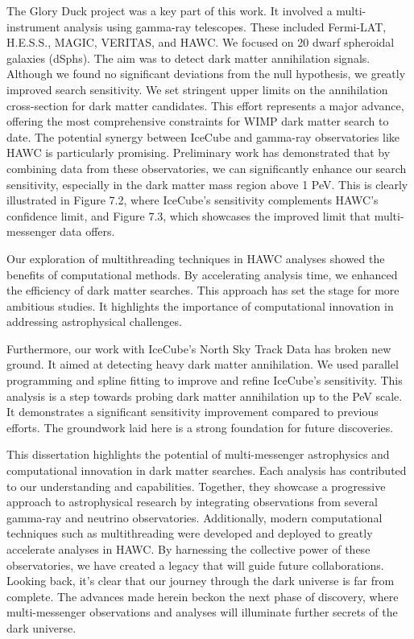 The Glory Duck project was a key part of this work.
It involved a multi-instrument analysis using gamma-ray telescopes. These included Fermi-LAT, H.E.S.S., MAGIC, VERITAS, and HAWC.
We focused on 20 dwarf spheroidal galaxies (dSphs).
The aim was to detect dark matter annihilation signals.
Although we found no significant deviations from the null hypothesis, we greatly improved search sensitivity.
We set stringent upper limits on the annihilation cross-section for dark matter candidates.
This effort represents a major advance, offering the most comprehensive constraints for WIMP dark matter search to date.
The potential synergy between IceCube and gamma-ray observatories like HAWC is particularly promising.
Preliminary work has demonstrated that by combining data from these observatories, we can significantly enhance our search sensitivity, especially in the dark matter mass region above 1 PeV.
This is clearly illustrated in Figure 7.2, where IceCube's sensitivity complements HAWC's confidence limit, and Figure 7.3, which showcases the improved limit that multi-messenger data offers.

Our exploration of multithreading techniques in HAWC analyses showed the benefits of computational methods.
By accelerating analysis time, we enhanced the efficiency of dark matter searches. This approach has set the stage for more ambitious studies.
It highlights the importance of computational innovation in addressing astrophysical challenges.

Furthermore, our work with IceCube's North Sky Track Data has broken new ground.
It aimed at detecting heavy dark matter annihilation.
We used parallel programming and spline fitting to improve and refine IceCube's  sensitivity.
This analysis is a step towards probing dark matter annihilation up to the PeV scale.
It demonstrates a significant sensitivity improvement compared to previous efforts.
The groundwork laid here is a strong foundation for future discoveries.

This dissertation highlights the potential of multi-messenger astrophysics and computational innovation in dark matter searches.
Each analysis has contributed to our understanding and capabilities.
Together, they showcase a progressive approach to astrophysical research by integrating observations from several gamma-ray and neutrino observatories.
Additionally, modern computational techniques such as multithreading were developed and deployed to greatly accelerate analyses in HAWC.
By harnessing the collective power of these observatories, we have created a legacy that will guide future collaborations.
Looking back, it's clear that our journey through the dark universe is far from complete.
The advances made herein beckon the next phase of discovery, where multi-messenger observations and analyses will illuminate further secrets of the dark universe.